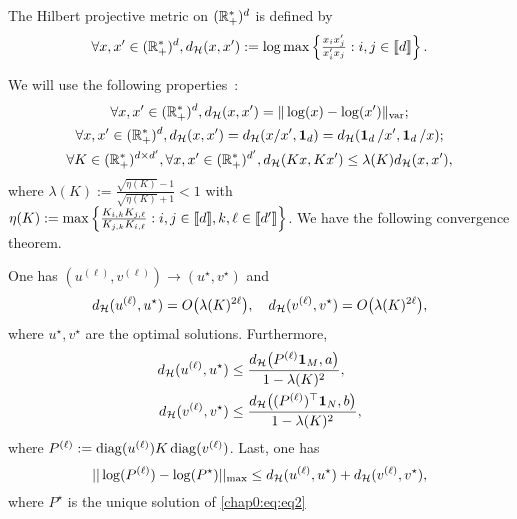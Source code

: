 \begin{definition}
The Hilbert projective metric on $(\mathbb{R}_{+}^{*})^{d}$ is defined by
\begin{equation*}
  \forall x, x' \in  (\mathbb{R}_{+}^{*})^{d}, d_{\mathcal{H}}
  (x,x') :=  \log \max\left\{\tfrac{x_i x'_j}{x'_i  x_j} : i,j \in  \llbracket d
    \rrbracket\right\}.
\end{equation*}
\end{definition}
We will use the following properties~\cite{Birkhoff}:
\begin{gather}
\label{chap0:prop1}
  \forall x, x' \in (\mathbb{R}_{+}^{*})^{d}, d_{\mathcal{H}} (x,x') = \| \log(x) -
  \log(x') \|_{\operatorname{var}};\\
  \label{chap0:prop2}
  \forall x, x' \in (\mathbb{R}^{*}_{+})^{d}, d_{\mathcal{H}}(x, x') = d_{\mathcal{H}}(x/x',
  \operatorname{\textbf{1}}_d) = d_{\mathcal{H}}(\operatorname{\textbf{1}}_d/x', \operatorname{\textbf{1}}_d/x);\\
  \label{chap0:prop3}
  \forall K \in (\mathbb{R}_{+}^{*})^{d \times d'}, \forall x, x' \in
  (\mathbb{R}^{*}_{+})^{d'}, d_{\mathcal{H}}(Kx, Kx') \leq \lambda(K) d_{\mathcal{H}}(x, x'),
\end{gather}
where  $\lambda(K) :=  \tfrac{\sqrt{\eta(K)} -1}{\sqrt{\eta(K)}+1}  < 1$  with
$\eta(K) :=  \max\left\{\tfrac{K_{i,k} K_{j,\ell}}{K_{j,k} K_{i, \ell}}  : i,j
  \in \llbracket d \rrbracket, k,\ell \in \llbracket d' \rrbracket\right\}$. 
We have the following convergence theorem.
\begin{theorem}
One has $(u^{(\ell)}, v^{(\ell)})  \rightarrow (u^{\star}, v^{\star})$ and  
\begin{equation}
\label{chap0:eq:cv0}
d_{\mathcal{H}}(u^{(\ell)}, u^{\star}) =  O \big(\lambda(K)^{2 \ell}\big), \quad d_{\mathcal{H}}(v^{(\ell)}, v^{\star}) = O\big(\lambda(K)^{2\ell} \big),
\end{equation}
where $u^{\star}, v^{\star}$ are the optimal solutions. Furthermore,
\begin{align}
\label{chap0:eq:cv1}
d_{\mathcal{H}}(u^{(\ell)}, u^{\star}) &\leq \frac{d_{\mathcal{H}}\big(P^{(\ell)} \mathbf{1}_M, a \big)}{1 - \lambda(K)^2},\\
\label{chap0:eq:cv2}
d_{\mathcal{H}}(v^{(\ell)}, v^{\star}) &\leq \frac{d_{\mathcal{H}}\big((P^{(\ell)})^{\top} \mathbf{1}_N, b \big)}{1 - \lambda(K)^2},
\end{align}
where $P^{(\ell)} := \operatorname{diag}(u^{(\ell)}) K \operatorname{diag}(v^{(\ell)})$. Last, one has 
\begin{equation}
\label{chap0:eq:cv3}
||\log(P^{(\ell)}) - \log(P^{\star}) ||_{\max} \leq d_{\mathcal{H}}( u^{(\ell)}, u^{\star}) + d_{\mathcal{H}}( v^{(\ell)}, v^{\star}),
\end{equation}
where $P^{\star}$ is the unique solution of \eqref{chap0:eq:eq2}
\end{theorem}
